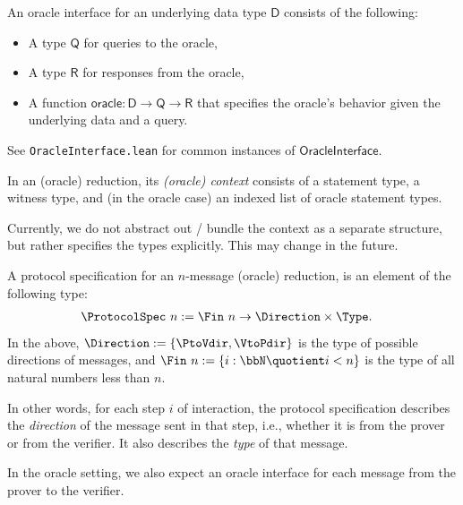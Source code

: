 \begin{definition}
    \label{def:oracle_interface}
    An oracle interface for an underlying data type $\mathsf{D}$ consists of the following:
    \begin{itemize}
        \item A type $\mathsf{Q}$ for queries to the oracle,
        \item A type $\mathsf{R}$ for responses from the oracle,
        \item A function $\mathsf{oracle} : \mathsf{D} \to \mathsf{Q} \to \mathsf{R}$ that specifies
        the oracle's behavior given the underlying data and a query.
    \end{itemize}
\end{definition}

See \texttt{OracleInterface.lean} for common instances of $\mathsf{OracleInterface}$.


\begin{definition}[Context]
    \label{def:context}
    In an (oracle) reduction, its \emph{(oracle) context} consists of a statement type, a witness
    type, and (in the oracle case) an indexed list of oracle statement types.

    Currently, we do not abstract out / bundle the context as a separate structure, but rather
    specifies the types explicitly. This may change in the future.
\end{definition}

\begin{definition}
    \label{def:protocol_spec}
    A protocol specification for an $n$-message (oracle) reduction, is an element of the following type:
    \begin{align*}
        \ProtocolSpec\ n &:= \Fin\ n \to \Direction \times \Type.
    \end{align*}
    In the above, $\Direction := \{ \PtoVdir, \VtoPdir \}$ is the type of possible directions of messages, and $\Fin\ n := \{ i : \bbN \quotient i < n \}$ is the type of all natural numbers less than $n$.

    In other words, for each step $i$ of interaction, the protocol specification describes the \emph{direction} of the message sent in that step, i.e., whether it is from the prover or from the verifier. It also describes the \emph{type} of that message.

    In the oracle setting, we also expect an oracle interface for each message from the prover to the verifier.
\end{definition}

